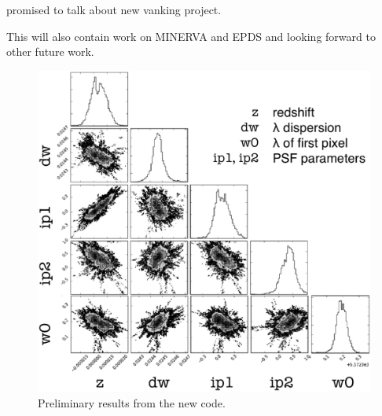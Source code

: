 promised to talk about new vanking project.




This will also contain work on MINERVA and EPDS and looking forward to
other future work.



\begin{figure}
\centering
\includegraphics[scale=0.3]{conclusion/mcmcplot-labeled.eps}
\caption{Preliminary results from the new code.
\label{conclusion:fig:mcmc}}
\end{figure}
